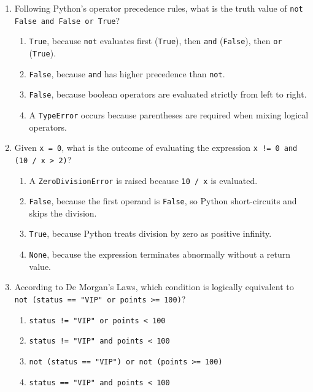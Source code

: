 \documentclass[11pt,a4paper]{article}
\begin{document}
\begin{enumerate}[label=\textbf{Q\arabic*.},leftmargin=2em,itemsep=1.5pt,topsep=1pt,resume]

\item Following Python's operator precedence rules, what is the truth value of \texttt{not False and False or True}?
\begin{enumerate}[label=\Alph*.,leftmargin=2em]
  \item \texttt{True}, because \texttt{not} evaluates first (\texttt{True}), then \texttt{and} (\texttt{False}), then \texttt{or} (\texttt{True}).
  \item \texttt{False}, because \texttt{and} has higher precedence than \texttt{not}.
  \item \texttt{False}, because boolean operators are evaluated strictly from left to right.
  \item A \texttt{TypeError} occurs because parentheses are required when mixing logical operators.
\end{enumerate}

\item Given \texttt{x = 0}, what is the outcome of evaluating the expression \texttt{x != 0 and (10 / x > 2)}?
\begin{enumerate}[label=\Alph*.,leftmargin=2em]
  \item A \texttt{ZeroDivisionError} is raised because \texttt{10 / x} is evaluated.
  \item \texttt{False}, because the first operand is \texttt{False}, so Python short-circuits and skips the division.
  \item \texttt{True}, because Python treats division by zero as positive infinity.
  \item \texttt{None}, because the expression terminates abnormally without a return value.
\end{enumerate}

\item According to De Morgan's Laws, which condition is logically equivalent to \texttt{not (status == "VIP" or points >= 100)}?
\begin{enumerate}[label=\Alph*.,leftmargin=2em]
  \item \texttt{status != "VIP" or points < 100}
  \item \texttt{status != "VIP" and points < 100}
  \item \texttt{not (status == "VIP") or not (points >= 100)}
  \item \texttt{status == "VIP" and points < 100}
\end{enumerate}


\end{enumerate}
\end{document}
